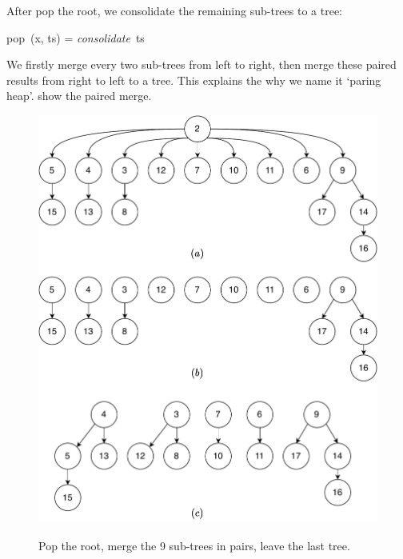 \documentclass[b5paper]{article}
\begin{document}
After pop the root, we consolidate the remaining sub-trees to a tree:

\be
pop\ (x, ts) = \textit{consolidate}\ ts
\ee

We firstly merge every two sub-trees from left to right, then merge these paired results from right to left to a tree. This explains the why we name it `paring heap'.  show the paired merge.

\begin{figure}[htbp]
  \centering
  \includegraphics[scale=0.5]{img/pairs-merge} \\
  \caption{Pop the root, merge the 9 sub-trees in pairs, leave the last tree.}
  \label{fig:merge-pairs}
\end{figure}
\end{document}
